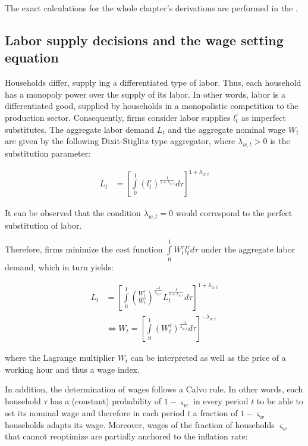 \documentclass{pracamgr}
\numberwithin{equation}{section}
\begin{document}
The exact calculations for the whole chapter's derivations are performed in the .

\subsection{Labor supply decisions and the wage setting equation} \label{Labor Supply decisions and the wage setting equation}

Households differ, supply ing a differentiated type of labor. Thus, each household has a monopoly power over the supply of its labor. In other words, labor is a differentiated good, supplied by households in a monopolistic competition to the production sector. Consequently, firms consider labor supplies $l_{t}^{\tau}$ as imperfect substitutes. The aggregate labor demand $L_{t}$ and the aggregate nominal wage $W_{t}$ are given by the following Dixit-Stiglitz type aggregator, where $\lambda_{w ,t} > 0$ is the substitution parameter:

\begin{align}
L_{t} &= \left[ \int\limits_{0}^{1} \left( l_{t}^{\tau} \right)^{\frac{1}{1+\lambda_{w,t}}} d\tau \right]^{1+\lambda_{w,t}}
\end{align}

It can be observed that the condition $\lambda_{w ,t} = 0$ would correspond to the perfect substitution of labor.

Therefore, firms minimize the cost function $\int\limits_{0}^{1} W_{t}^{\tau} l_{t}^{\tau} d\tau$ under the aggregate labor demand, which in turn yields:

\begin{align} \label{Aggregate labor demand}
L_{t} &= \left[ \int\limits_{0}^{1} \left( \frac{W_{t}^{\tau}}{W_{t}}\right)^{\frac{-1}{\lambda_{w ,t}}} L_{t}^{\frac{1}{1+\lambda_{w ,t}}} d\tau \right]^{1+\lambda_{w,t}} \nonumber \\
& \iff W_{t} = \left[ \int\limits_{0}^{1} \left( W_{t}^{\tau} \right)^{\frac{-1}{\lambda_{w ,t}}}  d\tau \right]^{-\lambda_{w,t}}
\end{align}

where the Lagrange multiplier $W_{t}$ can be interpreted as well as the price of a working hour and thus a wage index.

In addition, the determination of wages follows a Calvo rule. In other words, each household $\tau$ has a (constant) probability of $1-\varsigma_{w}$ in every period $t$ to be able to set its nominal wage and therefore in each period $t$ a fraction of $1-\varsigma_{w}$ households adapts its wage. Moreover, wages of the fraction of households $\varsigma_{w}$ that cannot reoptimize are partially anchored to the inflation rate:
\end{document}
